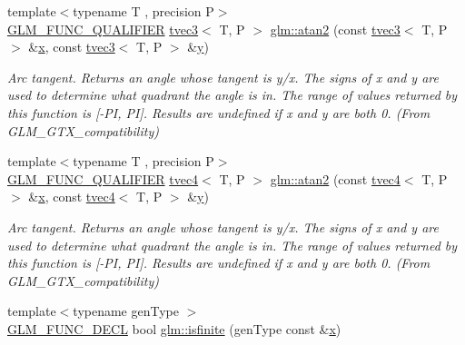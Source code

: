 \begin{DoxyCompactItemize}
{\footnotesize template$<$typename T , precision P$>$ }\\\mbox{\hyperlink{setup_8hpp_a33fdea6f91c5f834105f7415e2a64407}{G\+L\+M\+\_\+\+F\+U\+N\+C\+\_\+\+Q\+U\+A\+L\+I\+F\+I\+ER}} \mbox{\hyperlink{structglm_1_1tvec3}{tvec3}}$<$ T, P $>$ \mbox{\hyperlink{group__gtx__compatibility_gad328042b6734d3f2c49c0ec1328b14c0}{glm\+::atan2}} (const \mbox{\hyperlink{structglm_1_1tvec3}{tvec3}}$<$ T, P $>$ \&\mbox{\hyperlink{glad_8h_a92d0386e5c19fb81ea88c9f99644ab1d}{x}}, const \mbox{\hyperlink{structglm_1_1tvec3}{tvec3}}$<$ T, P $>$ \&\mbox{\hyperlink{glad_8h_a66ddd433d2cacfe27f5906b7e86faeed}{y}})
\begin{DoxyCompactList}\small\item\em Arc tangent. Returns an angle whose tangent is y/x. The signs of x and y are used to determine what quadrant the angle is in. The range of values returned by this function is \mbox{[}-\/PI, PI\mbox{]}. Results are undefined if x and y are both 0. (From G\+L\+M\+\_\+\+G\+T\+X\+\_\+compatibility) \end{DoxyCompactList}\item 
{\footnotesize template$<$typename T , precision P$>$ }\\\mbox{\hyperlink{setup_8hpp_a33fdea6f91c5f834105f7415e2a64407}{G\+L\+M\+\_\+\+F\+U\+N\+C\+\_\+\+Q\+U\+A\+L\+I\+F\+I\+ER}} \mbox{\hyperlink{structglm_1_1tvec4}{tvec4}}$<$ T, P $>$ \mbox{\hyperlink{group__gtx__compatibility_ga09d39c391a509a045b6c7061f15bdff5}{glm\+::atan2}} (const \mbox{\hyperlink{structglm_1_1tvec4}{tvec4}}$<$ T, P $>$ \&\mbox{\hyperlink{glad_8h_a92d0386e5c19fb81ea88c9f99644ab1d}{x}}, const \mbox{\hyperlink{structglm_1_1tvec4}{tvec4}}$<$ T, P $>$ \&\mbox{\hyperlink{glad_8h_a66ddd433d2cacfe27f5906b7e86faeed}{y}})
\begin{DoxyCompactList}\small\item\em Arc tangent. Returns an angle whose tangent is y/x. The signs of x and y are used to determine what quadrant the angle is in. The range of values returned by this function is \mbox{[}-\/PI, PI\mbox{]}. Results are undefined if x and y are both 0. (From G\+L\+M\+\_\+\+G\+T\+X\+\_\+compatibility) \end{DoxyCompactList}\item 
{\footnotesize template$<$typename gen\+Type $>$ }\\\mbox{\hyperlink{setup_8hpp_ab2d052de21a70539923e9bcbf6e83a51}{G\+L\+M\+\_\+\+F\+U\+N\+C\+\_\+\+D\+E\+CL}} bool \mbox{\hyperlink{group__gtx__compatibility_gaf4b04dcd3526996d68c1bfe17bfc8657}{glm\+::isfinite}} (gen\+Type const \&\mbox{\hyperlink{glad_8h_a92d0386e5c19fb81ea88c9f99644ab1d}{x}})

\end{DoxyCompactItemize}
